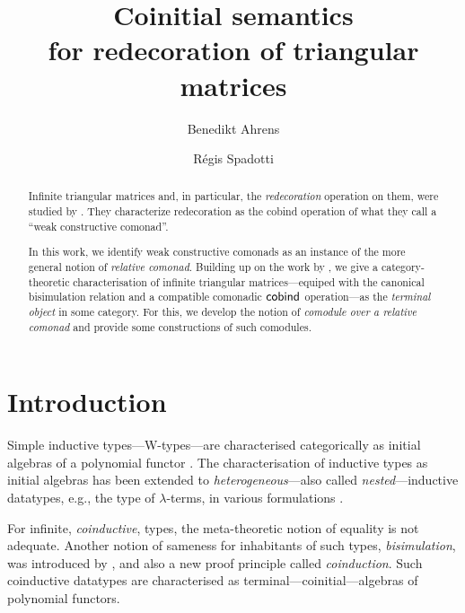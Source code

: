 \documentclass{amsart}
\author{Benedikt Ahrens}
\author{R\'egis Spadotti}
\title[Coinitial semantics for redecoration of triangular matrices]{Coinitial semantics \\ for redecoration of triangular matrices}
\begin{document}
\begin{abstract}
  Infinite triangular matrices and, in particular, the \emph{redecoration} operation on them, 
  were studied by \citeauthor{DBLP:conf/types/MatthesP11}. They characterize redecoration
  as the cobind operation of what they call a \enquote{weak constructive comonad}.
  
  In this work, we identify weak constructive comonads as an instance of the more general notion of 
  \emph{relative comonad}.
  Building up on the work by \citeauthor{DBLP:conf/types/MatthesP11}, we give a category-theoretic
  characterisation of infinite triangular matrices---equiped with the canonical bisimulation relation and a 
  compatible comonadic $\mathsf{cobind}$ operation---as the \emph{terminal object}
  in some category.
% 
  For this, we develop the notion of \emph{comodule over a relative comonad} and provide some constructions of such comodules.

\end{abstract}

\maketitle


\section{Introduction}

 Simple inductive types---\textsf{W}-types---are characterised categorically as initial algebras of
 a polynomial functor \parencite{DBLP:journals/apal/MoerdijkP00}.
 The characterisation of inductive types as initial algebras 
 has been extended to \emph{heterogeneous}---also called \emph{nested}---inductive datatypes, e.g., the type of $\lambda$-terms,
 in various formulations \parencite{fpt, DBLP:journals/iandc/HirschowitzM10}.
 
 For infinite, \emph{coinductive}, types, the meta-theoretic notion of equality is not adequate. Another notion of sameness for inhabitants of such types, 
 \emph{bisimulation}, was introduced by \textcite{aczel_nonwellfounded}, and also
 a new proof principle called \emph{coinduction}. 
 Such coinductive datatypes are characterised as terminal---coinitial---algebras of polynomial functors.
\end{document}
